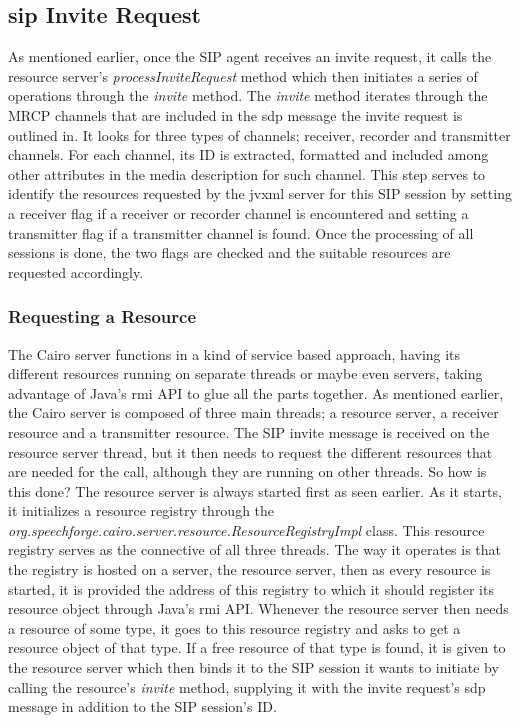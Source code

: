 \subsection{\ac{sip} Invite Request}
As mentioned earlier, once the SIP agent receives an invite request, it calls the resource server's \textit{processInviteRequest} method which then initiates a series of operations through the \textit{invite} method.
The \textit{invite} method iterates through the MRCP channels that are included in the \ac{sdp} message the invite request is outlined in.
It looks for three types of channels; receiver, recorder and transmitter channels.
For each channel, its ID is extracted, formatted and included among other attributes in the media description for such channel.
This step serves to identify the resources requested by the \ac{jvxml} server for this SIP session by setting a receiver flag if a receiver or recorder channel is encountered and setting a transmitter flag if a transmitter channel is found.
Once the processing of all sessions is done, the two flags are checked and the suitable resources are requested accordingly.

\subsubsection{Requesting a Resource}
The Cairo server functions in a kind of service based approach, having its different resources running on separate threads or maybe even servers, taking advantage of Java's \ac{rmi} API to glue all the parts together.
As mentioned earlier, the Cairo server is composed of three main threads; a resource server, a receiver resource and a transmitter resource.
The SIP invite message is received on the resource server thread, but it then needs to request the different resources that are needed for the call, although they are running on other threads.
So how is this done?
The resource server is always started first as seen earlier.
As it starts, it initializes a resource registry through the \textit{org.speechforge.cairo.server.resource.ResourceRegistryImpl} class.
This resource registry serves as the connective of all three threads.
The way it operates is that the registry is hosted on a server, the resource server, then as every resource is started, it is provided the address of this registry to which it should register its resource object through Java's \ac{rmi} API.
Whenever the resource server then needs a resource of some type, it goes to this resource registry and asks to get a resource object of that type.
If a free resource of that type is found, it is given to the resource server which then binds it to the SIP session it wants to initiate by calling the resource's \textit{invite} method, supplying it with the invite request's \ac{sdp} message in addition to the SIP session's ID.

